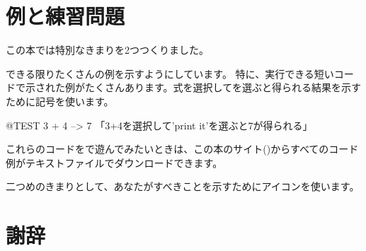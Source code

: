 \documentclass[a4paper,10pt,twoside]{book}
\begin{document}
\section*{例と練習問題}

この本では特別なきまりを2つつくりました。

できる限りたくさんの例を示すようにしています。
特に、実行できる短いコードで示された例がたくさんあります。式を選択してを選ぶと得られる結果を示すために\ct{-->}記号を使います。

\begin{code}{@TEST}
3 + 4 --> 7    「3+4を選択して'print it'を選ぶと7が得られる」
\end{code}

これらのコードを\pharo で遊んでみたいときは、この本のサイト(\pbe)からすべてのコード例がテキストファイルでダウンロードできます。

二つめのきまりとして、あなたがすべきことを示すために\dothisicon{}アイコンを使います。


\section*{謝辞}
\end{document}
